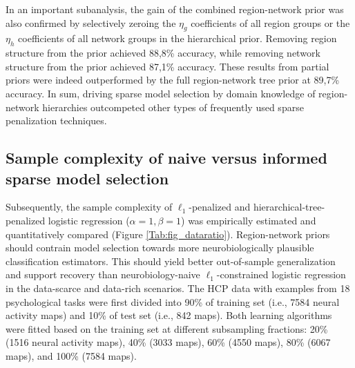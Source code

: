 \documentclass{article}
\begin{document}
In an important subanalysis,
the gain of the combined region-network prior was also confirmed by
selectively zeroing
the $\eta_g$ coefficients of all region groups
or
the $\eta_h$ coefficients of all network groups in the hierarchical prior.
Removing region structure from the prior achieved
88,8\% accuracy,
while removing network structure from the prior achieved
87,1\% accuracy.
These results from partial priors were indeed outperformed by
the full region-network tree prior at 89,7\% accuracy.
%
In sum,
driving sparse model selection by domain knowledge of region-network hierarchies
outcompeted other types of frequently used sparse penalization techniques.


\subsection{Sample complexity of naive versus informed sparse model selection}
Subsequently, the sample complexity of
$\ell_1$-penalized and hierarchical-tree-penalized logistic regression
($\alpha = 1, \beta = 1$)
was empirically estimated and quantitatively compared
(Figure \ref{Tab:fig_dataratio}).
Region-network priors should contrain model selection towards more
neurobiologically plausible classification estimators.
This should yield better out-of-sample generalization and
support recovery than
neurobiology-naive $\ell_1$-constrained logistic regression
in the data-scarce and data-rich scenarios.
%
The HCP data with examples from 18
psychological tasks were first divided into
90\% of training set (i.e., 7584 neural activity maps) and
10\% of test set (i.e., 842 maps).
Both learning algorithms were fitted based on the
training set at different subsampling fractions:
20\% (1516 neural activity maps),
40\% (3033 maps),
60\% (4550 maps),
80\% (6067 maps), and
100\% (7584 maps).
\end{document}
